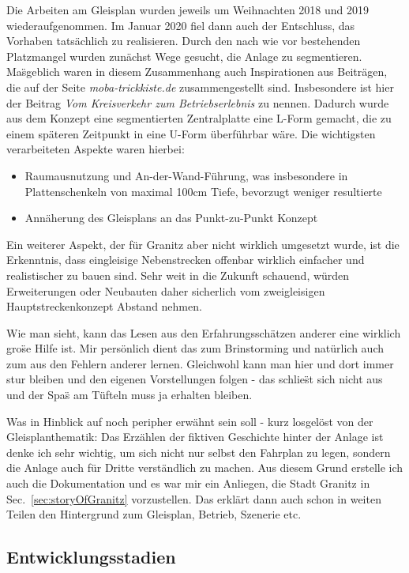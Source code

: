 Die Arbeiten am Gleisplan wurden jeweils um Weihnachten 2018 und 2019 wiederaufgenommen.
Im Januar 2020 fiel dann auch der Entschluss, das Vorhaben tats\"achlich zu realisieren.
Durch den nach wie vor bestehenden Platzmangel wurden zun\"achst Wege gesucht, die Anlage zu segmentieren.
Ma\"sgeblich waren in diesem Zusammenhang auch Inspirationen aus Beitr\"agen, die auf der Seite \textit{moba-trickkiste.de} zusammengestellt sind.
Insbesondere ist hier der Beitrag \textit{Vom Kreisverkehr zum Betriebserlebnis} \cite{Gee17} zu nennen.
Dadurch wurde aus dem Konzept eine segmentierten Zentralplatte eine L-Form gemacht, die zu einem sp\"ateren Zeitpunkt in eine U-Form \"uberf\"uhrbar w\"are.
Die wichtigsten verarbeiteten Aspekte waren hierbei:
\begin{itemize}
	\item Raumausnutzung und An-der-Wand-F\"uhrung, was insbesondere in Plattenschenkeln von maximal 100cm Tiefe, bevorzugt weniger resultierte
	\item Ann\"aherung des Gleisplans an das Punkt-zu-Punkt Konzept
\end{itemize}
Ein weiterer Aspekt, der f\"ur Granitz aber nicht wirklich umgesetzt wurde, ist die Erkenntnis, dass eingleisige Nebenstrecken offenbar wirklich einfacher und realistischer zu bauen sind.
Sehr weit in die Zukunft schauend, w\"urden Erweiterungen oder Neubauten daher sicherlich vom zweigleisigen Hauptstreckenkonzept Abstand nehmen.

Wie man sieht, kann das Lesen aus den Erfahrungssch\"atzen anderer eine wirklich gro\"se Hilfe ist.
Mir pers\"onlich dient das zum Brinstorming und nat\"urlich auch zum aus den Fehlern anderer lernen.
Gleichwohl kann man hier und dort immer stur bleiben und den eigenen Vorstellungen folgen - das schlie\"st sich nicht aus und der Spa\"s am T\"ufteln muss ja erhalten bleiben.

Was in Hinblick auf \cite{Gee17} noch peripher erw\"ahnt sein soll - kurz losgel\"ost von der Gleisplanthematik:
Das Erz\"ahlen der fiktiven Geschichte hinter der Anlage ist denke ich sehr wichtig, um sich nicht nur selbst den Fahrplan zu legen, sondern die Anlage auch f\"ur Dritte verst\"andlich zu machen.
Aus diesem Grund erstelle ich auch die Dokumentation und es war mir ein Anliegen, die Stadt Granitz in Sec.~\ref{sec:storyOfGranitz} vorzustellen.
Das erkl\"art dann auch schon in weiten Teilen den Hintergrund zum Gleisplan, Betrieb, Szenerie etc.


\subsection{Entwicklungsstadien}
\label{sec:map_history}

